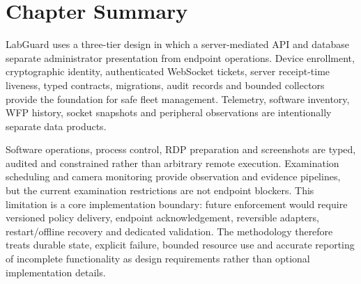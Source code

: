 \documentclass[12pt,a4paper]{report}
\begin{document}
\section{Chapter Summary}
LabGuard uses a three-tier design in which a server-mediated API and database
separate administrator presentation from endpoint operations. Device
enrollment, cryptographic identity, authenticated WebSocket tickets, server
receipt-time liveness, typed contracts, migrations, audit records and bounded
collectors provide the foundation for safe fleet management. Telemetry,
software inventory, WFP history, socket snapshots and peripheral observations
are intentionally separate data products.

Software operations, process control, RDP preparation and screenshots are
typed, audited and constrained rather than arbitrary remote execution.
Examination scheduling and camera monitoring provide observation and evidence
pipelines, but the current examination restrictions are not endpoint blockers.
This limitation is a core implementation boundary: future enforcement would
require versioned policy delivery, endpoint acknowledgement, reversible
adapters, restart/offline recovery and dedicated validation. The methodology
therefore treats durable state, explicit failure, bounded resource use and
accurate reporting of incomplete functionality as design requirements rather
than optional implementation details.
\end{document}
